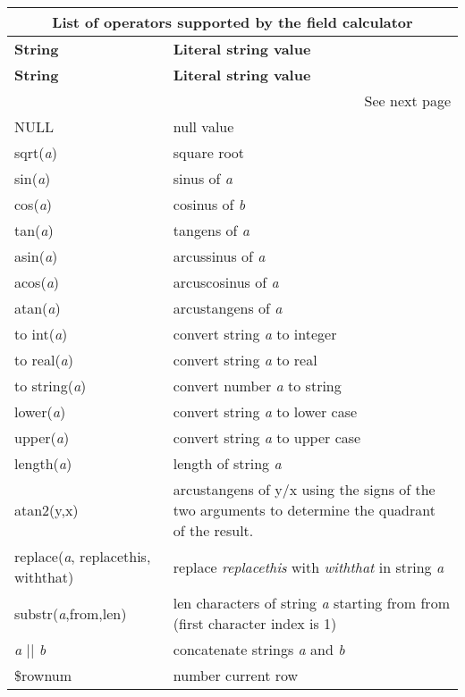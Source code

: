 \begin{center}
{\setlength{\extrarowheight}{10pt}
\small
\begin{longtable}{|p{4cm}|p{10cm}|}
\hline \multicolumn{2}{|c|}{\textbf{List of operators supported by the field calculator}}\\
\hline \textbf{String}&\textbf{Literal string value}\\
\endfirsthead
\hline \textbf{String}&\textbf{Literal string value}\\
\endhead
\hline \multicolumn{2}{|r|}{{See next page}} \\ \hline
\endfoot
\endlastfoot
\hline NULL & null value \\
\hline sqrt(\textit{a}) & square root \\
\hline sin(\textit{a}) & sinus of \textit{a} \\
\hline cos(\textit{a}) & cosinus of \textit{b} \\
\hline tan(\textit{a}) & tangens of \textit{a} \\
\hline asin(\textit{a}) & arcussinus of \textit{a} \\
\hline acos(\textit{a}) & arcuscosinus of \textit{a} \\
\hline atan(\textit{a}) & arcustangens of \textit{a} \\
\hline to int(\textit{a}) & convert string \textit{a} to integer \\
\hline to real(\textit{a}) & convert string \textit{a} to real \\
\hline to string(\textit{a}) & convert number \textit{a} to string \\
\hline lower(\textit{a}) & convert string \textit{a} to lower case \\
\hline upper(\textit{a}) & convert string \textit{a} to upper case \\
\hline length(\textit{a}) & length of string \textit{a} \\
\hline atan2(y,x) & arcustangens of y/x using the signs of the two arguments to determine the quadrant of the result. \\
\hline replace(\textit{a}, replacethis, withthat) & replace \textit{replacethis} with \textit{withthat} in string \textit{a} \\
\hline substr(\textit{a},from,len) & len characters of string \textit{a} starting from from (first character index is 1) \\
\hline \textit{a} || \textit{b} & concatenate strings \textit{a} and \textit{b} \\
\hline \$rownum & number current row \\

\end{longtable}}
\end{center}
